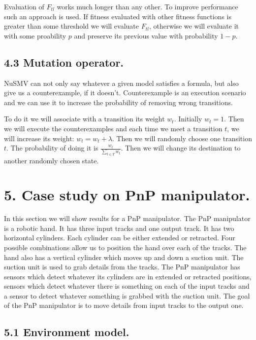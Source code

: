 \documentclass[fleqn,twocolumn]{article}
\begin{document}
Evaluation of $F_{tl}$ works much longer than any other. To improve performance such an approach is used. If fitness evaluated with other fitness functions is
greater than some threshold we will evaluate $F_{tl}$, otherwise we will evaluate it with some proability $p$ and preserve its previous value with probability $1 - p$.

\subsection{4.3 Mutation operator.}

NuSMV can not only say whatever a given model satisfies a formula, but also give us a counterexample, if it doesn't. Counterexample is an execution scenario and we can
use it to increase the probability of removing wrong transitions.

To do it we will associate with a transition its weight $w_t$. Initially $w_t = 1$. Then we will execute the counterexamples and each time we meet a transition $t$, we
will increase its weight: $w_t = w_t + \lambda$. Then we will randomly choose one transition $t$. The probability of doing it is $\frac{w_t}{\sum_{t \in T}w_t}$.
Then we will change its destination to another randomly chosen state.

\section{5. Case study on PnP manipulator.}

In this section we will show results for a PnP manipulator. The PnP manipulator is a robotic hand. It has three input tracks and one output track.
It has two horizontal cylinders. Each cylinder can be either extended or retracted. Four possible combinations allow us to position the hand
over each of the tracks. The hand also has a vertical cylinder which moves up and down a suction unit. The suction unit is used to grab details
from the tracks. The PnP manipulator has sensors which detect whatever its cylinders are in extended or retracted positions, sensors which detect
whatever there is something on each of the input tracks and a sensor to detect whatever something is grabbed with the suction unit. The goal
of the PnP manipulator is to move details from input tracks to the output one.

\subsection{5.1 Environment model.}
\end{document}
